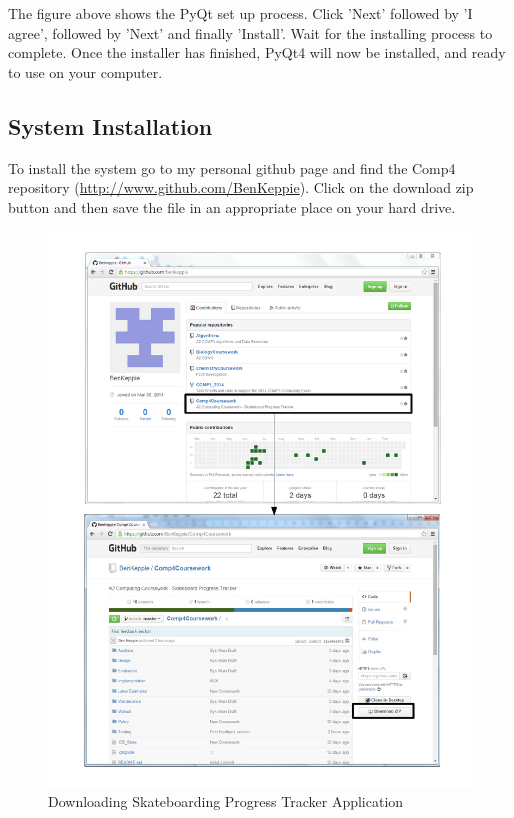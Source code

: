 The figure above shows the PyQt set up process. Click 'Next' followed by 'I agree', followed by 'Next' and finally 'Install'. Wait for the installing process to complete. Once the installer has finished, PyQt4 will now be installed, and ready to use on your computer.

\subsection{System Installation}

To install the system go to my personal github page and find the Comp4 repository (\url{http://www.github.com/BenKeppie}). Click on the download zip button and then save the file in an appropriate place on your hard drive.

\begin{figure}[H]
    \includegraphics[width=\textwidth]{./Manual/Images/BenGithub.pdf}
    \caption{Downloading Skateboarding Progress Tracker Application} \label{fig:Downloading Program}
\end{figure}

